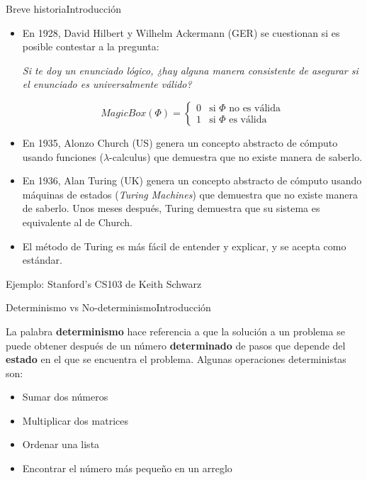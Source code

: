 \documentclass[spanish, c]{beamer}
\begin{document}
\begin{frame}[allowframebreaks]{Breve historia}{Introducción}

    \begin{itemize}
        \itemsep3.5ex
        \item En 1928, David Hilbert y Wilhelm Ackermann (GER) se cuestionan si es posible contestar a la pregunta:\\
        \begin{center}
            \textit{Si te doy un enunciado lógico, ¿hay alguna manera consistente de asegurar si el enunciado es universalmente válido?}
        \end{center}
        $$MagicBox(\Phi) = \begin{cases}0 & \text{si $\Phi$ no es válida} \\ 1 & \text{si $\Phi$ es válida}\end{cases}$$
        \item En 1935, Alonzo Church (US) genera un concepto abstracto de cómputo usando funciones ($\lambda$-calculus) que demuestra que no existe manera de saberlo.
        \item En 1936, Alan Turing (UK) genera un concepto abstracto de cómputo usando máquinas de estados (\textit{Turing Machines}) que demuestra que no existe manera de saberlo. Unos meses después, Turing demuestra que su sistema es equivalente al de Church.
        \item El método de Turing es más fácil de entender y explicar, y se acepta como estándar.
    \end{itemize}

    \begin{center}
        \LARGE Ejemplo: Stanford's CS103 de Keith Schwarz
    \end{center}

\end{frame}

\begin{frame}{Determinismo vs No-determinismo}{Introducción}
    
    La palabra \textbf{determinismo} hace referencia a que la solución a un problema se puede obtener después de un número \textbf{determinado} de pasos que depende del \textbf{estado} en el que se encuentra el problema. Algunas operaciones deterministas son: \pause
    
    \bigskip

    \begin{itemize}
        \item Sumar dos números \pause
        \item Multiplicar dos matrices \pause
        \item Ordenar una lista \pause
        \item Encontrar el número más pequeño en un arreglo
    \end{itemize}
\end{frame}
\end{document}
